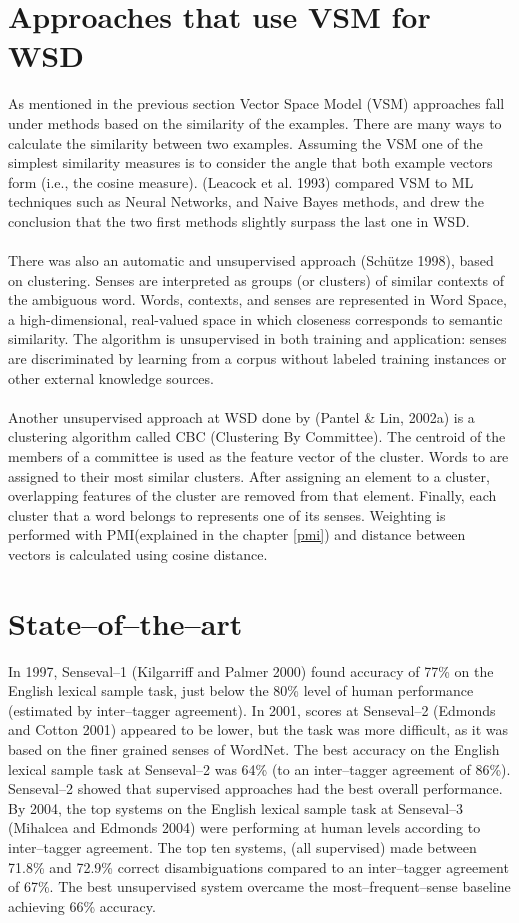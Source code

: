 \section{Approaches that use VSM for WSD}
As mentioned in the previous section Vector Space Model (VSM) approaches fall under methods based on the similarity of the examples. There are many ways to calculate the similarity between two examples.
Assuming the VSM one of the simplest similarity
measures is to consider the angle that both example vectors form (i.e., the
cosine measure). (Leacock et al. 1993) compared VSM to ML 
 techniques such as Neural Networks,
and Naive Bayes methods, and drew the conclusion that the two first
methods slightly surpass the last one in WSD. 
\\\\
There was also an automatic and unsupervised approach (Sch\"utze 1998), based on clustering. Senses are interpreted as groups (or clusters) of similar contexts of the ambiguous word. Words, contexts, and senses are represented in Word Space, a high-dimensional, real-valued space in which closeness corresponds to semantic similarity. The algorithm is unsupervised in both training and application: senses are discriminated by learning from a corpus without labeled training instances or other external knowledge sources.
\\\\
Another unsupervised approach at WSD done by (Pantel \& Lin, 2002a) is a clustering algorithm called CBC (Clustering By Committee). The centroid of the members of a 
committee is used as the feature vector of the cluster. Words to are assigned to their most similar 
clusters. After assigning an element to a cluster, overlapping features of the cluster are removed from that element. Finally, each 
cluster that a word belongs to represents one of its senses. Weighting is performed with PMI(explained in the chapter \ref{pmi}) and distance between vectors is calculated using cosine distance. 

\section{State--of--the--art}
In 1997, Senseval--1 (Kilgarriff and Palmer 2000) found accuracy of 77\% on the English lexical sample task, just below the 80\% level of human performance (estimated by inter--tagger agreement). In 2001, scores at Senseval--2 (Edmonds and Cotton 2001) appeared to be lower, but the task was more difficult, as it was based on the finer grained senses of WordNet. The best accuracy on the English lexical sample task at Senseval--2 was 64\% (to an inter--tagger agreement of 86\%). Senseval--2 showed that supervised approaches had the best overall performance.
\\By 2004, the top systems on the English lexical sample task at Senseval--3 (Mihalcea and Edmonds 2004) were performing at human levels according to inter--tagger agreement. The top ten systems, (all supervised) made between 71.8\% and 72.9\% correct disambiguations compared to an inter--tagger agreement of 67\%. The best unsupervised system overcame the most--frequent--sense baseline achieving 66\% accuracy.
